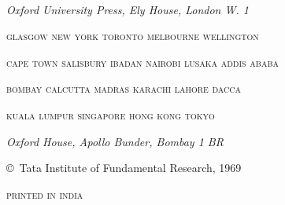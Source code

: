 \newpage

~\phantom{a}

\thispagestyle{empty}


\begin{center}
{\em Oxford University Press, Ely House, London W. 1}
\medskip

\textsc{\small glasgow new york toronto melbourne wellington}

\textsc{\small cape town salisbury ibadan nairobi lusaka addis ababa}

\textsc{\small bombay calcutta madras karachi lahore dacca}

\textsc{\small kuala lumpur singapore hong kong tokyo}

\textit{\small Oxford House, Apollo Bunder, Bombay 1 BR}


\vfill

\copyright\ Tata Institute of Fundamental Research, 1969

\medskip
\textsc{printed in india}
\end{center}

\eject
